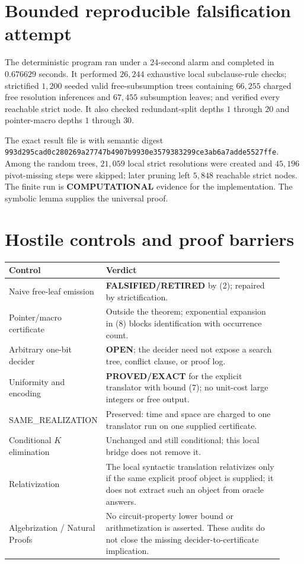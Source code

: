 \documentclass[11pt]{article}
\newcommand{\EXACT}{\textbf{PROVED/EXACT}}
\newcommand{\COMP}{\textbf{COMPUTATIONAL}}
\newcommand{\OPEN}{\textbf{OPEN}}
\newcommand{\RET}{\textbf{FALSIFIED/RETIRED}}
\begin{document}
\section{Bounded reproducible falsification attempt}
The deterministic program
ran under a 24-second alarm and completed in $0.676629$ seconds.  It performed
$26{,}244$ exhaustive local subclause-rule checks; strictified $1{,}200$
seeded valid free-subsumption trees containing $66{,}255$ charged free
resolution inferences and $67{,}455$ subsumption leaves; and verified every
reachable strict node.  It also checked redundant-split depths $1$ through
$20$ and pointer-macro depths $1$ through $30$.

The exact result file is
with semantic digest
\texttt{993d295cad0c280269a27747b4907b9930e3579383299ce3ab6a7adde5527ffe}.
Among the random trees, $21{,}059$ local strict resolutions were created and
$45{,}196$ pivot-missing steps were skipped; later pruning left $5{,}848$
reachable strict nodes.  The finite run is \COMP{} evidence for the
implementation.  The symbolic lemma supplies the universal proof.

\section{Hostile controls and proof barriers}
\begin{longtable}{p{0.25\linewidth}p{0.67\linewidth}}
\toprule
Control & Verdict \\
\midrule
Naive free-leaf emission & \RET{} by (2); repaired by strictification.\\
Pointer/macro certificate & Outside the theorem; exponential expansion in
(8) blocks identification with occurrence count.\\
Arbitrary one-bit decider & \OPEN{}; the decider need not expose a search tree,
conflict clause, or proof log.\\
Uniformity and encoding & \EXACT{} for the explicit translator with bound
(7); no unit-cost large integers or free output.\\
SAME\_REALIZATION & Preserved: time and space are charged to one translator
run on one supplied certificate.\\
Conditional $K$ elimination & Unchanged and still conditional; this local
bridge does not remove it.\\
Relativization & The local syntactic translation relativizes only if the
same explicit proof object is supplied; it does not extract such an object
from oracle answers.\\
Algebrization / Natural Proofs & No circuit-property lower bound or
arithmetization is asserted.  These audits do not close the missing
decider-to-certificate implication.\\
\bottomrule
\end{longtable}
\end{document}
